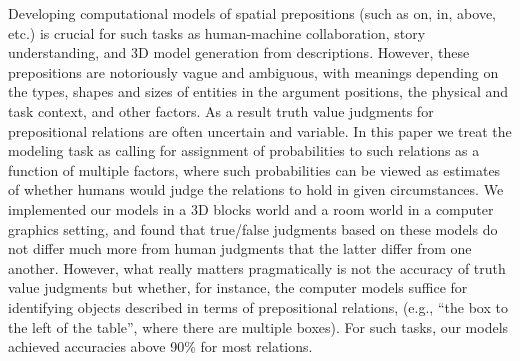 Developing computational models of spatial prepositions (such as on, in, above, etc.) is crucial for such tasks as human-machine collaboration, story understanding, and 3D model generation from descriptions. However, these prepositions are notoriously vague and ambiguous, with meanings depending on the types, shapes and sizes of entities in the argument positions, the physical and task context, and other factors. As a result truth value judgments for prepositional relations are often uncertain and variable. In this paper we treat the modeling task as calling for assignment of probabilities to such relations as a function of multiple factors, where such probabilities can be viewed as estimates of whether humans would judge the relations to hold in given circumstances. We implemented our models in a 3D blocks world and a room world in a computer graphics setting, and found that true/false judgments based on these models do not differ much more from human judgments that the latter differ from one another. However, what really matters pragmatically is not the accuracy of truth value judgments but whether, for instance, the computer models suffice for identifying objects described in terms of prepositional relations, (e.g., ``the box to the left of the table'', where there are multiple boxes). For such tasks, our models achieved accuracies above 90\% for most relations.
